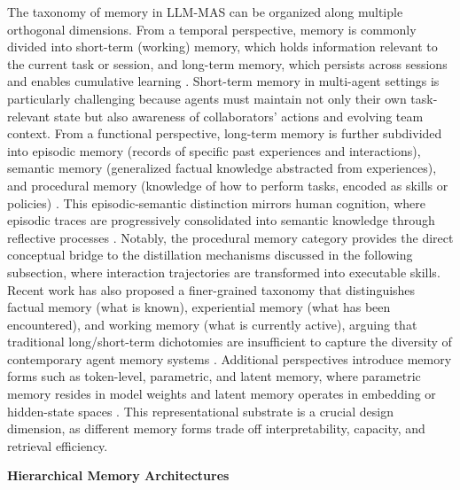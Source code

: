 \documentclass[11pt]{article}
\begin{document}
The taxonomy of memory in LLM-MAS can be organized along multiple orthogonal dimensions. From a temporal perspective, memory is commonly divided into short-term (working) memory, which holds information relevant to the current task or session, and long-term memory, which persists across sessions and enables cumulative learning \cite{ref113,ref114}. Short-term memory in multi-agent settings is particularly challenging because agents must maintain not only their own task-relevant state but also awareness of collaborators' actions and evolving team context. From a functional perspective, long-term memory is further subdivided into episodic memory (records of specific past experiences and interactions), semantic memory (generalized factual knowledge abstracted from experiences), and procedural memory (knowledge of how to perform tasks, encoded as skills or policies) \cite{ref112,ref115}. This episodic-semantic distinction mirrors human cognition, where episodic traces are progressively consolidated into semantic knowledge through reflective processes \cite{ref116,ref117}. Notably, the procedural memory category provides the direct conceptual bridge to the distillation mechanisms discussed in the following subsection, where interaction trajectories are transformed into executable skills. Recent work has also proposed a finer-grained taxonomy that distinguishes factual memory (what is known), experiential memory (what has been encountered), and working memory (what is currently active), arguing that traditional long/short-term dichotomies are insufficient to capture the diversity of contemporary agent memory systems \cite{ref113}. Additional perspectives introduce memory forms such as token-level, parametric, and latent memory, where parametric memory resides in model weights and latent memory operates in embedding or hidden-state spaces \cite{ref113,ref114}. This representational substrate is a crucial design dimension, as different memory forms trade off interpretability, capacity, and retrieval efficiency.

\textbf{Hierarchical Memory Architectures}
\end{document}
